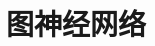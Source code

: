 \setcounter{chapter}{8}

\hypertarget{ux56feux795eux7ecfux7f51ux7edc}{%
\chapter{图神经网络}\label{ux56feux795eux7ecfux7f51ux7edc}}
